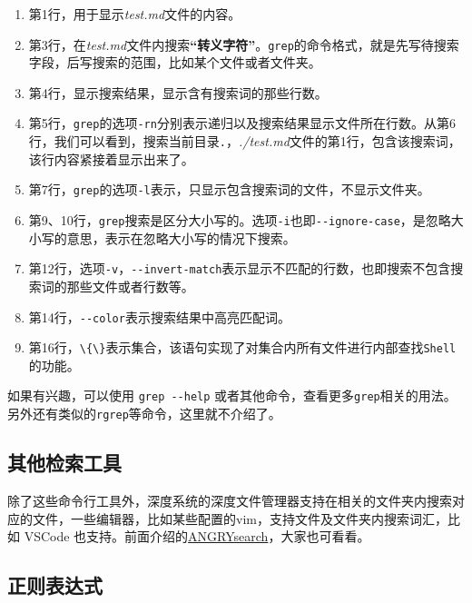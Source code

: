 \documentclass[doctor,openright,twoside]{sjtuthesis}
\providecommand{\tightlist}{%
    \setlength{\itemsep}{0pt}\setlength{\parskip}{0pt}}
\newcommand{\passthrough}[1]{#1}
\theoremstyle{plain}
\theoremstyle{definition}
\theoremstyle{remark}
\theoremstyle{ocrenumbox}
\theoremstyle{plain}
\begin{document}
\begin{enumerate}
\def\labelenumi{\arabic{enumi}.}
\tightlist
\item
  第1行，用于显示\emph{test.md}文件的内容。
\item
  第3行，在\emph{test.md}文件内搜索\textbf{``转义字符''}。\passthrough{\lstinline!grep!}的命令格式，就是先写待搜索字段，后写搜索的范围，比如某个文件或者文件夹。
\item
  第4行，显示搜索结果，显示含有搜索词的那些行数。
\item
  第5行，\passthrough{\lstinline!grep!}的选项\passthrough{\lstinline!-rn!}分别表示递归以及搜索结果显示文件所在行数。从第6行，我们可以看到，搜索当前目录\passthrough{\lstinline!.!}，\emph{./test.md}文件的第1行，包含该搜索词，该行内容紧接着显示出来了。
\item
  第7行，\passthrough{\lstinline!grep!}的选项\passthrough{\lstinline!-l!}表示，只显示包含搜索词的文件，不显示文件夹。
\item
  第9、10行，\passthrough{\lstinline!grep!}搜索是区分大小写的。选项\passthrough{\lstinline!-i!}也即\passthrough{\lstinline!--ignore-case!}，是忽略大小写的意思，表示在忽略大小写的情况下搜索。
\item
  第12行，选项\passthrough{\lstinline!-v!}，\passthrough{\lstinline!--invert-match!}表示显示不匹配的行数，也即搜索不包含搜索词的那些文件或者行数等。
\item
  第14行，\passthrough{\lstinline!--color!}表示搜索结果中高亮匹配词。
\item
  第16行，\passthrough{\lstinline!\{\}!}表示集合，该语句实现了对集合内所有文件进行内部查找\passthrough{\lstinline!Shell!}的功能。
\end{enumerate}

如果有兴趣，可以使用 \passthrough{\lstinline!grep --help!}
或者其他命令，查看更多\passthrough{\lstinline!grep!}相关的用法。另外还有类似的\passthrough{\lstinline!rgrep!}等命令，这里就不介绍了。

\subsection{其他检索工具}

除了这些命令行工具外，深度系统的深度文件管理器支持在相关的文件夹内搜索对应的文件，一些编辑器，比如某些配置的vim，支持文件及文件夹内搜索词汇，比如
VSCode
也支持。前面介绍的\href{https://github.com/DoTheEvo/ANGRYsearch}{ANGRYsearch}，大家也可看看。

\subsection{正则表达式}
\end{document}
